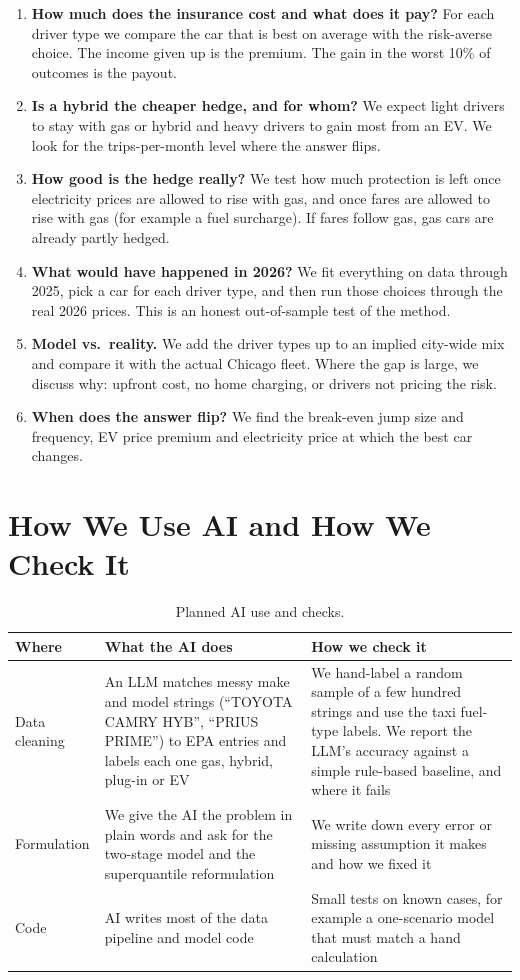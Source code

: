 \documentclass[11pt]{article}
\begin{document}
\begin{enumerate}
  \item \textbf{How much does the insurance cost and what does it pay?} For each driver type we compare the car that is best on average with the risk-averse choice. The income given up is the premium. The gain in the worst 10\% of outcomes is the payout.
  \item \textbf{Is a hybrid the cheaper hedge, and for whom?} We expect light drivers to stay with gas or hybrid and heavy drivers to gain most from an EV. We look for the trips-per-month level where the answer flips.
  \item \textbf{How good is the hedge really?} We test how much protection is left once electricity prices are allowed to rise with gas, and once fares are allowed to rise with gas (for example a fuel surcharge). If fares follow gas, gas cars are already partly hedged.
  \item \textbf{What would have happened in 2026?} We fit everything on data through 2025, pick a car for each driver type, and then run those choices through the real 2026 prices. This is an honest out-of-sample test of the method.
  \item \textbf{Model vs.\ reality.} We add the driver types up to an implied city-wide mix and compare it with the actual Chicago fleet. Where the gap is large, we discuss why: upfront cost, no home charging, or drivers not pricing the risk.
  \item \textbf{When does the answer flip?} We find the break-even jump size and frequency, EV price premium and electricity price at which the best car changes.
\end{enumerate}

\section{How We Use AI and How We Check It}

\begin{table}[ht]
\centering
\caption{Planned AI use and checks.}
\small
\begin{tabularx}{\textwidth}{@{}p{2.3cm} Y Y@{}}
\toprule
Where & What the AI does & How we check it \\
\midrule
Data cleaning & An LLM matches messy make and model strings (``TOYOTA CAMRY HYB'', ``PRIUS PRIME'') to EPA entries and labels each one gas, hybrid, plug-in or EV & We hand-label a random sample of a few hundred strings and use the taxi fuel-type labels. We report the LLM's accuracy against a simple rule-based baseline, and where it fails \\
Formulation & We give the AI the problem in plain words and ask for the two-stage model and the superquantile reformulation & We write down every error or missing assumption it makes and how we fixed it \\
Code & AI writes most of the data pipeline and model code & Small tests on known cases, for example a one-scenario model that must match a hand calculation \\
\bottomrule
\end{tabularx}
\end{table}
\end{document}
